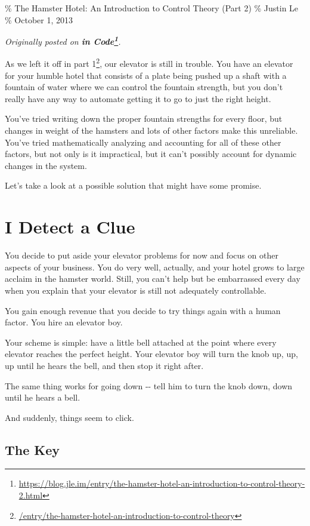 \documentclass[]{article}
\renewcommand{\href}[2]{#2\footnote{\url{#1}}}
\begin{document}
\% The Hamster Hotel: An Introduction to Control Theory (Part 2) \% Justin Le \%
October 1, 2013

\emph{Originally posted on
\textbf{\href{https://blog.jle.im/entry/the-hamster-hotel-an-introduction-to-control-theory-2.html}{in
Code}}.}

As we left it off in
\href{/entry/the-hamster-hotel-an-introduction-to-control-theory}{part 1}, our
elevator is still in trouble. You have an elevator for your humble hotel that
consists of a plate being pushed up a shaft with a fountain of water where we
can control the fountain strength, but you don't really have any way to automate
getting it to go to just the right height.

You've tried writing down the proper fountain strengths for every floor, but
changes in weight of the hamsters and lots of other factors make this
unreliable. You've tried mathematically analyzing and accounting for all of
these other factors, but not only is it impractical, but it can't possibly
account for dynamic changes in the system.

Let's take a look at a possible solution that might have some promise.

\section{I Detect a Clue}

You decide to put aside your elevator problems for now and focus on other
aspects of your business. You do very well, actually, and your hotel grows to
large acclaim in the hamster world. Still, you can't help but be embarrassed
every day when you explain that your elevator is still not adequately
controllable.

You gain enough revenue that you decide to try things again with a human factor.
You hire an elevator boy.

Your scheme is simple: have a little bell attached at the point where every
elevator reaches the perfect height. Your elevator boy will turn the knob up,
up, up until he hears the bell, and then stop it right after.

The same thing works for going down -\/- tell him to turn the knob down, down
until he hears a bell.

And suddenly, things seem to click.

\subsection{The Key}
\end{document}
